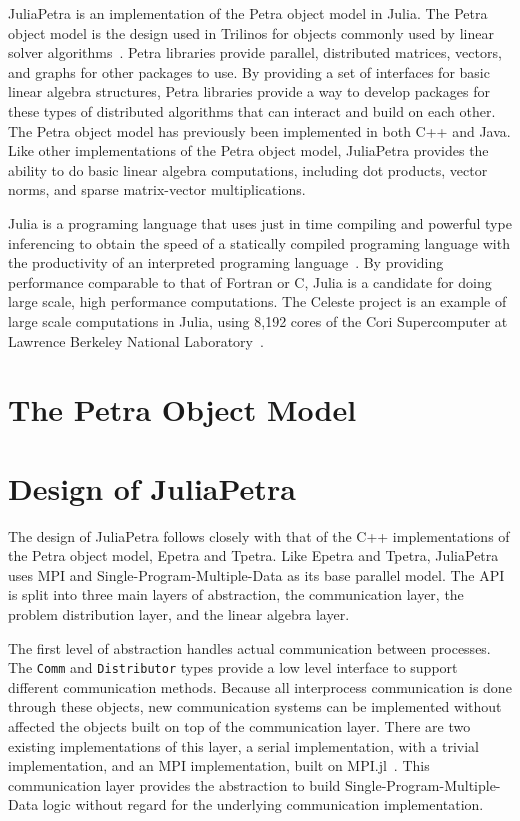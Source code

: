 \documentclass[acmsmall]{acmart}
\newcommand{\snippet}[1]{\lstinline{#1}}
\begin{document}
	JuliaPetra is an implementation of the Petra object model in Julia.
	The Petra object model is the design used in Trilinos for objects commonly used by linear solver algorithms~\cite{Heroux:2005:Trilinos}.
	Petra libraries provide parallel, distributed matrices, vectors, and graphs for other packages to use.
	By providing a set of interfaces for basic linear algebra structures, Petra libraries provide a way
	to develop packages for these types of distributed algorithms that can interact and build on each other.
	The Petra object model has previously been implemented in both C++ and Java.
	Like other implementations of the Petra object model, JuliaPetra provides the ability to do basic linear algebra computations, including dot products, vector norms, and sparse matrix-vector multiplications.
	
	Julia is a programing language that uses just in time compiling and powerful type inferencing
	to obtain the speed of a statically compiled programing language with the productivity of an
	interpreted programing language~\cite{Bezanson:2017:FreshApproach}.
	By providing performance comparable to that of Fortran or C, Julia is a candidate for doing large scale,
	high performance computations.
	The Celeste project is an example of large scale computations in Julia,
	using 8,192 cores of the Cori Supercomputer
	at Lawrence Berkeley National Laboratory~\cite{Bezanson:2017:FreshApproach}.
	
	\section{The Petra Object Model}
	
	
	\section{Design of JuliaPetra}
	
	The design of JuliaPetra follows closely with that of the C++ implementations of the
	Petra object model, Epetra and Tpetra.
	Like Epetra and Tpetra, JuliaPetra uses MPI and Single-Program-Multiple-Data as its base parallel model.
	The API is split into three main layers of abstraction, the communication layer, the problem distribution layer, and the linear algebra layer.
	
	The first level of abstraction handles actual communication between processes.
	The \snippet{Comm} and \snippet{Distributor} types provide a low level interface to support different communication methods.
	Because all interprocess communication is done through these objects, new communication systems can be implemented without affected the objects built on top of the communication layer.
	There are two existing implementations of this layer, a serial implementation, with a trivial implementation, and an MPI implementation, built on MPI.jl~\cite{Github:MPI}.
	This communication layer provides the abstraction to build Single-Program-Multiple-Data logic without regard for the underlying communication implementation.
	
\end{document}
